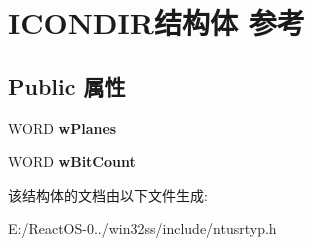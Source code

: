 \hypertarget{struct_i_c_o_n_d_i_r}{}\section{I\+C\+O\+N\+D\+I\+R结构体 参考}
\label{struct_i_c_o_n_d_i_r}
\subsection*{Public 属性}
\begin{DoxyCompactItemize}
\item 
\mbox{\label{struct_i_c_o_n_d_i_r_ad678e512aaab87331e0e71d0532b3afe}} 
W\+O\+RD {\bfseries w\+Planes}
\item 
\mbox{\label{struct_i_c_o_n_d_i_r_a4a5eab51ce0e6699d310344137c0333e}} 
W\+O\+RD {\bfseries w\+Bit\+Count}
\end{DoxyCompactItemize}


该结构体的文档由以下文件生成\+:\begin{DoxyCompactItemize}
\item 
E\+:/\+React\+O\+S-\/0../win32ss/include/ntusrtyp.\+h\end{DoxyCompactItemize}
